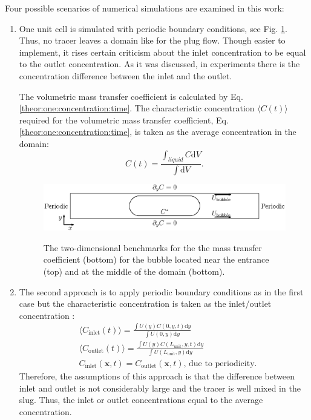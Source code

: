 \documentclass{article}
\newcommand{\beq}{\begin{equation}}
\newcommand{\feq}{\end{equation}}
\newcommand{\beqal}{\begin{equation}\begin{aligned}}
\newcommand{\feqal}{\end{aligned}\end{equation}}
\newcommand{\lunit}{L_{\mathrm{unit}}}
\newcommand{\cinlet}{C_{\mathrm{inlet}}}
\newcommand{\coutlet}{C_{\mathrm{outlet}}}
\begin{document}
Four possible scenarios of  numerical simulations are examined in this work: 
\begin{enumerate}
\item %
One unit
cell is simulated with
periodic boundary conditions, see Fig. \ref{fig:benchmark}. 
Thus, no tracer leaves a
domain like for the plug flow. 
Though easier to implement, it rises certain criticism
about the inlet concentration to be equal to the outlet concentration. As it was discussed, in experiments there is the concentration difference between the inlet and
 the outlet.

The volumetric mass transfer coefficient is calculated by Eq. \ref{theor:one:concentration:time}.
The
characteristic concentration $\langle C(t) \rangle$ required for the volumetric mass
transfer coefficient, Eq.
\ref{theor:one:concentration:time}, is taken as the average concentration in the domain:
\beq
\label{average:concentration:definition}
C(t)=\frac{\int_{liquid}{C \mathrm{d}V}}{\int{\mathrm{d}V}}.
\feq
\begin{figure}[htb!]
\includegraphics[width=\textwidth]{Figures/benchmark_middle.eps}\\
\caption{The two-dimensional benchmarks for the  the mass transfer
coefficient (bottom) for the bubble located near the entrance (top) and at the middle of the domain
(bottom). \label{fig:benchmark}}
\end{figure}
\item The second approach is to apply periodic boundary conditions as in the first case but the characteristic concentration is taken as the inlet/outlet
concentration \cite{vanbaten-circular}:
\beqal
&\langle \cinlet(t) \rangle=\frac{\int{U(y) C(0,y,t) \mathrm{d}y}}{\int{U(0,y) \mathrm{d}y}}\\
&\langle \coutlet(t) \rangle=\frac{\int{U(y) C(\lunit,y,t) \mathrm{d}y}}{\int{U(\lunit,y)
\mathrm{d}y}}\\
&\cinlet(\bm{x},t)=\coutlet(\bm{x},t),\,\text{due to periodicity}.
\feqal
Therefore, the assumptions  of this approach is
that the difference between inlet and outlet is not
considerably large and the tracer is well mixed in the slug. Thus, the inlet or outlet
concentrations equal to the average concentration. 


\end{enumerate}
\end{document}
